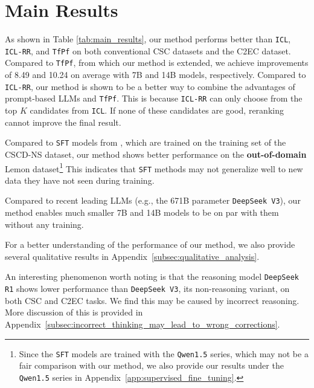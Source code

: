 \section{Main Results}
As shown in Table \ref{tab:main_results}, our method performs better than \texttt{ICL}, \texttt{ICL-RR}, and \texttt{TfPf} on both conventional CSC datasets and the C2EC dataset.
Compared to \texttt{TfPf}, from which our method is extended, we achieve improvements of 8.49 and 10.24 on average with 7B and 14B models, respectively.
Compared to \texttt{ICL-RR}, our method is shown to be a better way to combine the advantages of prompt-based LLMs and \texttt{TfPf}.
This is because \texttt{ICL-RR} can only choose from the top $K$ candidates from \texttt{ICL}.
If none of these candidates are good, reranking cannot improve the final result.

Compared to \texttt{SFT} models from \citet{li-etal-2024-cllm}, which are trained on the training set of the CSCD-NS dataset, our method shows better performance on the \textbf{out-of-domain} Lemon dataset\footnote{Since the \texttt{SFT} models are trained with the \texttt{Qwen1.5} series, which may not be a fair comparison with our method, we also provide our results under the \texttt{Qwen1.5} series in Appendix~\ref{app:supervised_fine_tuning}.}
This indicates that \texttt{SFT} methods may not generalize well to new data they have not seen during training.

Compared to recent leading LLMs (e.g., the 671B parameter \texttt{DeepSeek\,V3}), our method enables much smaller 7B and 14B models to be on par with them without any training.

For a better understanding of the performance of our method, we also provide several qualitative results in Appendix~\ref{subsec:qualitative_analysis}.


An interesting phenomenon worth noting is that the reasoning model \texttt{DeepSeek\,R1} shows lower performance than \texttt{DeepSeek\,V3}, its non-reasoning variant, on both CSC and C2EC tasks.
We find this may be caused by incorrect reasoning.
More discussion of this is provided in Appendix~\ref{subsec:incorrect_thinking_may_lead_to_wrong_corrections}.
